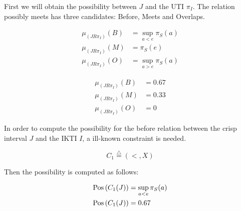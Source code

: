 \begin{example}
First we will obtain the possibility between $J$ and the UTI $\pi_I$. The relation possibly meets has three candidates: Before, Meets and Overlaps.

\begin{align}
  \mu_{\left(J R \pi_I \right)}(B) &= \sup_{a < e} \pi_S(a)\\
\mu_{\left(J R \pi_I \right)}(M) &= \pi_S(e)\\
\mu_{\left(J R \pi_I \right)}(O) &= \sup_{a > e} \pi_S(a)
\end{align}

\begin{align}
\mu_{\left(J R \pi_I \right)}(B) &= 0.67\\
\mu_{\left(J R \pi_I \right)}(M) &= 0.33\\
\mu_{\left(J R \pi_I \right)}(O) &= 0
\end{align}

In order to compute the possibility  for the before relation between the crisp interval $J$ and the IKTI $I$, a ill-known constraint is needed.

\begin{equation}
 C_1\stackrel{\triangle}{=} \left(<,X\right)
\end{equation}

Then the possibility is computed as follows:

\begin{align}
\operatorname{Pos} \left(C_1 (J) \right) &= \sup_{a < e} \pi_S(a)\\
\operatorname{Pos} \left(C_1 (J) \right) &= 0.67 
\end{align}






\end{example}



% 

